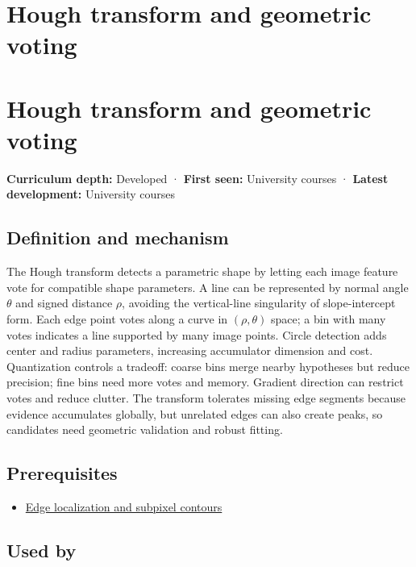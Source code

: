 \hypertarget{appendix-a5b0383b3b3e}{}
\section*{Hough transform and geometric voting}
\section{Hough transform and geometric voting}\label{appendix-a5b0383b3b3e-hough-transform-and-geometric-voting}

\textbf{Curriculum depth:} Developed · \textbf{First seen:} University courses · \textbf{Latest development:} University courses

\subsection{Definition and mechanism}\label{appendix-a5b0383b3b3e-definition-and-mechanism}

The Hough transform detects a parametric shape by letting each image feature vote for compatible shape parameters. A line can be represented by normal angle \(\theta\) and signed distance \(\rho\), avoiding the vertical-line singularity of slope-intercept form. Each edge point votes along a curve in \((\rho,\theta)\) space; a bin with many votes indicates a line supported by many image points. Circle detection adds center and radius parameters, increasing accumulator dimension and cost. Quantization controls a tradeoff: coarse bins merge nearby hypotheses but reduce precision; fine bins need more votes and memory. Gradient direction can restrict votes and reduce clutter. The transform tolerates missing edge segments because evidence accumulates globally, but unrelated edges can also create peaks, so candidates need geometric validation and robust fitting.

\subsection{Prerequisites}\label{appendix-a5b0383b3b3e-prerequisites}

\begin{itemize}
\tightlist
\item
  \hyperref[appendix-36022286b03e]{Edge localization and subpixel contours}
\end{itemize}

\subsection{Used by}\label{appendix-a5b0383b3b3e-used-by}

